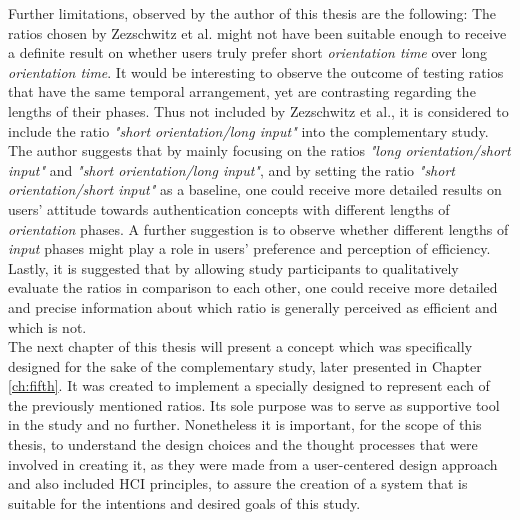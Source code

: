 Further limitations, observed by the author of this thesis are the following: The ratios chosen by Zezschwitz et al. \cite{Zezschwitz} might not have been suitable enough to receive a definite result on whether users truly prefer short \textit{orientation time} over long \textit{orientation time}. It would be interesting to observe the outcome of testing ratios that have the same temporal arrangement, yet are contrasting regarding the lengths of their phases. Thus not included by Zezschwitz et al., it is considered to include the ratio \textit{"short orientation/long input"} into the complementary study. The author suggests that by mainly focusing on the ratios \textit{"long orientation/short input"} and \textit{"short orientation/long input"}, and by setting the ratio \textit{"short orientation/short input"} as a baseline, one could receive more detailed results on users' attitude towards authentication concepts with different lengths of \textit{orientation} phases. A further suggestion is to observe whether different lengths of \textit{input} phases might play a role in users' preference and perception of efficiency. Lastly, it is suggested that by allowing study participants to qualitatively evaluate the ratios in comparison to each other, one could receive more detailed and precise information about which ratio is generally perceived as efficient and which is not. \\

The next chapter of this thesis will present a concept which was specifically designed for the sake of the complementary study, later presented in Chapter \ref{ch:fifth}. It was created to implement a specially designed to represent each of the previously mentioned ratios. Its sole purpose was to serve as supportive tool in the study and no further. Nonetheless it is important, for the scope of this thesis, to understand the design choices and the thought processes that were involved in creating it, as they were made from a user-centered design approach and also included HCI principles, to assure the creation of a system that is suitable for the intentions and desired goals of this study. 








